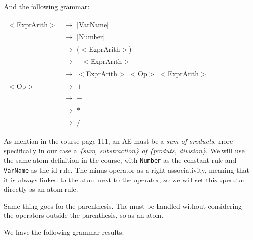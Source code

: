 \documentclass[letterpaper]{article}
\begin{document}
 And the following grammar:
    \begin{center}
            \begin{tabular}{l l}
                $<$ExprArith$>$ &$\rightarrow$ [VarName] \\
                 &$\rightarrow$ [Number] \\
                 &$\rightarrow$ ($<$ExprArith$>$) \\
                 &$\rightarrow$ - $<$ExprArith$>$ \\
                 &$\rightarrow$
                $<$ExprArith$>$ $<$Op$>$ $<$ExprArith$>$ \\
                $<$Op$>$ &$\rightarrow$ $+$ \\
                 &$\rightarrow$ $-$ \\
                 &$\rightarrow$ $*$ \\
                 &$\rightarrow$ $/$ \\
            \end{tabular}
    \end{center}


As mention in the course page 111, an AE must be a \textit{sum of products},
more specifically in our case a \textit{\{sum, substraction\}
of \{produts, division\}}. We will use the same atom definition in the course,
with \texttt{Number} as the constant rule and \texttt{VarName} as the id rule.
The minus operator as a right associativity, meaning that it is always linked
to the atom next to the operator, so we will set this operator directly as
an atom rule.

Same thing goes for the parenthesis. The must be handled without considering
the operators outside the parenthesis, so as an atom.

We have the following grammar results:
\end{document}
